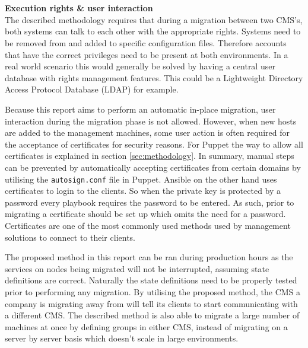 \\\\
\noindent
\textbf{Execution rights \& user interaction}\\
The described methodology requires that during a migration between two CMS's, both systems can talk to each other with the appropriate rights. Systems need to be removed from and added to specific configuration files. Therefore accounts that have the correct privileges need to be present at both environments. In a real world scenario this would generally be solved by having a central user database with rights management features. This could be a Lightweight Directory Access Protocol Database (LDAP) for example. 

Because this report aims to perform an automatic in-place migration, user interaction during the migration phase is not allowed. However, when new hosts are added to the management machines, some user action is often required for the acceptance of certificates for security reasons. For Puppet the way to allow all certificates is explained in section \ref{sec:methodology}. In summary, manual steps can be prevented by automatically accepting certificates from certain domains by utilising the \texttt{autosign.conf} file in Puppet. Ansible on the other hand uses certificates to login to the clients. So when the private key is protected by a password every playbook requires the password to be entered. As such, prior to migrating a certificate should be set up which omits the need for a password. Certificates are one of the most commonly used methods used by management solutions to connect to their clients. 

The proposed method in this report can be ran during production hours as the services on nodes being migrated will not be interrupted, assuming state definitions are correct. Naturally the state definitions need to be properly tested prior to performing any migration. By utilising the proposed method, the CMS a company is migrating away from will tell its clients to start communicating with a different CMS. The described method is also able to migrate a large number of machines at once by defining groups in either CMS, instead of migrating on a server by server basis which doesn't scale in large environments.

